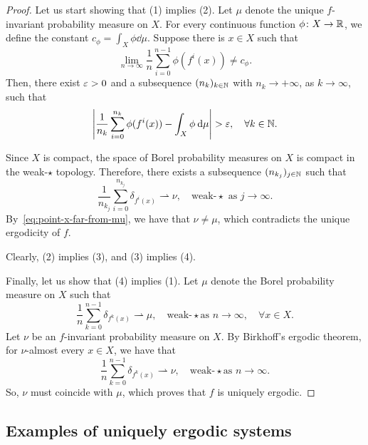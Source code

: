\begin{proof}
  Let us start showing that (1) implies (2). Let $\mu$ denote the unique $f$-invariant probability measure on $X$. For every continuous function $\phi\colon X\to\mathbb{R}$, we define the constant $c_\phi=\int_X\phi\dd\mu$. Suppose there is $x\in X$ such that
  \begin{displaymath}
    \lim_{n\to\infty}\frac{1}{n}\sum_{i=0}^{n-1}\phi(f^i(x))\neq c_\phi.
  \end{displaymath}
  Then, there exist $\varepsilon>0$ and a subsequence $(n_k)_{k\in\mathbb{N}}$ with $n_k\to+\infty$, as $k\to\infty$, such that
  \begin{equation}
    \label{eq:point-x-far-from-mu}
    \left|\frac{1}{n_k}\sum_{i=0}^{n_k}\phi(f^i(x))-\int_X\phi\dd\mu\right|>\eps,\quad\forall k\in\N.
  \end{equation}

  Since $X$ is compact, the space of Borel probability measures on $X$ is compact in the weak-$\star$ topology. Therefore, there exists a subsequence $(n_{k_j})_{j\in\mathbb{N}}$ such that
  \begin{displaymath}
    \frac{1}{n_{k_j}}\sum_{i=0}^{n_{k_j}}\delta_{f^i(x)}\rightharpoonup\nu,\quad\text{weak-}\star\text{ as }j\to\infty.
  \end{displaymath}
  By~\eqref{eq:point-x-far-from-mu}, we have that $\nu\neq\mu$, which contradicts the unique ergodicity of $f$.

  Clearly, (2) implies (3), and (3) implies (4).

  Finally, let us show that (4) implies (1). Let $\mu$ denote the Borel probability measure on $X$ such that
  \begin{displaymath}
    \frac{1}{n}\sum_{k=0}^{n-1}\delta_{f^k(x)}\rightharpoonup\mu, \quad\text{weak-}\star \text{as }n\to\infty,\quad\forall x\in X.
  \end{displaymath}
  Let $\nu$ be an $f$-invariant probability measure on $X$. By Birkhoff's ergodic theorem, for $\nu$-almost every $x\in X$, we have that
  \begin{displaymath}
    \frac{1}{n}\sum_{k=0}^{n-1}\delta_{f^k(x)}\rightharpoonup\nu, \quad\text{weak-}\star \text{as }n\to\infty.
  \end{displaymath}
  So, $\nu$ must coincide with $\mu$, which proves that $f$ is uniquely ergodic.
\end{proof}

\subsection{Examples of uniquely ergodic systems}
\label{sec:exampl-uniq-ergodicity}


